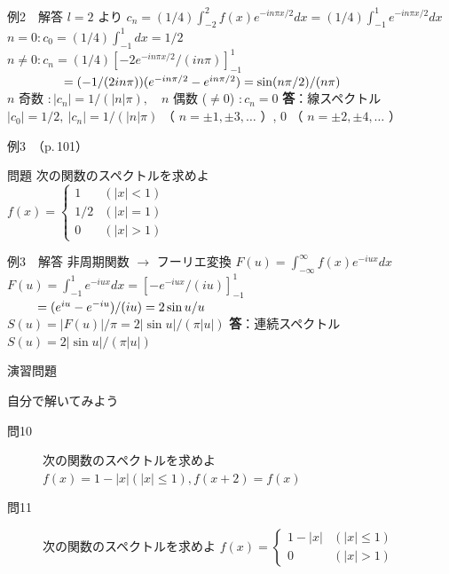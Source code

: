\documentclass[professionalfonts]{beamer}
\begin{document}
\begin{frame}{例2　解答}
  $l=2$ より $c_{n} = (1/4)\int_{-2}^{2} f(x) e^{-in\pi x/2} dx = (1/4)\int_{-1}^{1} e^{-in\pi x/2} dx$\\[4pt]
  $n=0: c_{0} = (1/4)\int_{-1}^{1} dx = 1/2$\\[4pt]
  $n\neq 0: c_{n} = (1/4)[-2 e^{-in\pi x/2}/(in\pi)]_{-1}^{1}$\\[4pt]
  $\hphantom{n\neq 0: c_{n}} = (-1/(2in\pi))(e^{-in\pi/2} - e^{in\pi/2}) = \sin(n\pi/2)/(n\pi)$\\[4pt]
  $n$ 奇数 $: |c_{n}| = 1/(|n|\pi),\quad n$ 偶数 ($\neq 0$) $: c_{n} = 0$
  \medskip\textbf{答}：線スペクトル\\
  $|c_{0}| = 1/2,\ |c_{n}| = 1/(|n|\pi)$ （ $n=\pm 1,\pm 3,\ldots$ ）, $0$ （ $n=\pm 2,\pm 4,\ldots$ ）
\end{frame}

\begin{frame}{例3　（p.\,101）}
  \begin{exampleblock}{問題}
    次の関数のスペクトルを求めよ\\[2pt]
    $f(x) = \begin{cases} 1 & (|x| < 1) \\ 1/2 & (|x| = 1) \\ 0 & (|x| > 1) \end{cases}$\\[2pt]
  \end{exampleblock}
\end{frame}

\begin{frame}{例3　解答}
  非周期関数 $\to$ フーリエ変換 $F(u) = \int_{-\infty}^{\infty} f(x) e^{-iux} dx$\\[4pt]
  $F(u) = \int_{-1}^{1} e^{-iux} dx = [-e^{-iux}/(iu)]_{-1}^{1}$\\[4pt]
  $\hphantom{F(u)} = (e^{iu} - e^{-iu})/(iu) = 2\sin u / u$\\[4pt]
  $S(u) = |F(u)|/\pi = 2|\sin u|/(\pi |u|)$
  \medskip\textbf{答}：連続スペクトル $S(u) = 2|\sin u|/(\pi |u|)$
\end{frame}

\begin{frame}{演習問題}
  \begin{exampleblock}{自分で解いてみよう}
  \begin{description}
    \item[問10] 次の関数のスペクトルを求めよ
    $f(x) = 1 - |x|  (|x| \leq 1),  f(x+2) = f(x)$\\
    \item[問11] 次の関数のスペクトルを求めよ
    $f(x) = \begin{cases} 1-|x| & (|x| \leq 1) \\ 0 & (|x| > 1) \end{cases}$\\
  \end{description}
  \end{exampleblock}
\end{frame}
\end{document}
